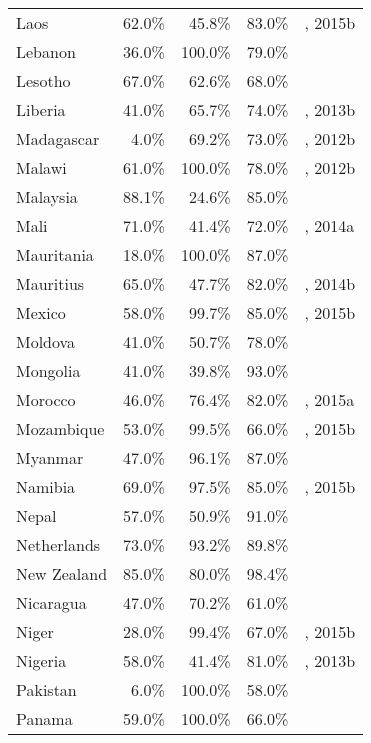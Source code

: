 \begin{longtable}{lrrrl}
  Laos & 62.0\% & 45.8\% & 83.0\% & \cite{AIDSdatahub-fg}, 2015b \\
  Lebanon & 36.0\% & 100.0\% & 79.0\% & \cite{Unaids2016-an} \\
  Lesotho & 67.0\% & 62.6\% & 68.0\% & \cite{Unaids2016-an} \\
  Liberia & 41.0\% & 65.7\% & 74.0\% & \cite{Unaids2016-an}, 2013b \\
  Madagascar & 4.0\% & 69.2\% & 73.0\% & \cite{Unaids2016-an}, 2012b \\
  Malawi & 61.0\% & 100.0\% & 78.0\% & \cite{Unaids2016-an}, 2012b \\
  Malaysia & 88.1\% & 24.6\% & 85.0\% & \cite{Unaids2016-an, AIDSdatahub-fg} \\
  Mali & 71.0\% & 41.4\% & 72.0\% & \cite{Unaids2016-an}, 2014a \\
  Mauritania & 18.0\% & 100.0\% & 87.0\% & \cite{Unaids2016-an} \\
  Mauritius & 65.0\% & 47.7\% & 82.0\% & \cite{Unaids2016-an}, 2014b \\
  Mexico & 58.0\% & 99.7\% & 85.0\% & \cite{Unaids2016-an}, 2015b \\
  Moldova & 41.0\% & 50.7\% & 78.0\% & \cite{Unaids2016-an} \\
  Mongolia & 41.0\% & 39.8\% & 93.0\% & \cite{Unaids2016-an, Unaids2016-am} \\
  Morocco & 46.0\% & 76.4\% & 82.0\% & \cite{Unaids2016-an}, 2015a \\
  Mozambique & 53.0\% & 99.5\% & 66.0\% & \cite{Unaids2016-an}, 2015b \\
  Myanmar & 47.0\% & 96.1\% & 87.0\% & \cite{Unaids2016-an} \\
  Namibia & 69.0\% & 97.5\% & 85.0\% & \cite{Unaids2016-an}, 2015b \\
  Nepal & 57.0\% & 50.9\% & 91.0\% & \cite{Unaids2016-an} \\
  Netherlands & 73.0\% & 93.2\% & 89.8\% & \cite{aid2014} \\
  New Zealand & 85.0\% & 80.0\% & 98.4\% & \cite{Unaids2016-am} \\
  Nicaragua & 47.0\% & 70.2\% & 61.0\% & \cite{Unaids2016-an} \\
  Niger & 28.0\% & 99.4\% & 67.0\% & \cite{Unaids2016-an}, 2015b \\
  Nigeria & 58.0\% & 41.4\% & 81.0\% & \cite{Unaids2016-an}, 2013b \\
  Pakistan & 6.0\% & 100.0\% & 58.0\% & \cite{Unaids2016-an} \\
  Panama & 59.0\% & 100.0\% & 66.0\% & \cite{Unaids2016-an} \\

\end{longtable}
